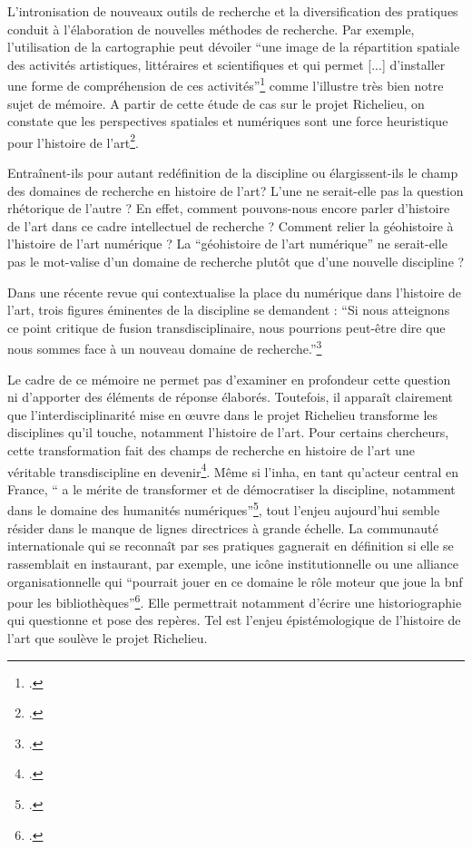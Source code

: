 L'intronisation de nouveaux outils de recherche et la diversification des pratiques conduit à l'élaboration de nouvelles méthodes de recherche. Par exemple, l'utilisation de la cartographie peut dévoiler \enquote{une image de la répartition spatiale des activités artistiques, littéraires et scientifiques et qui permet [...] d’installer une forme de compréhension de ces activités}\footcite{BESSEApproches2010} comme l'illustre très bien notre sujet de mémoire. A partir de cette étude de cas sur le projet Richelieu, on constate que les perspectives spatiales et numériques sont une force heuristique pour l'histoire de l'art\footcite{WINDHAGERReview}. 

Entraînent-ils pour autant redéfinition de la discipline ou élargissent-ils le champ des domaines de recherche en histoire de l'art? L'une ne serait-elle pas la question rhétorique de l'autre ? En effet, comment pouvons-nous encore parler d'histoire de l'art dans ce cadre intellectuel de recherche ? Comment relier la géohistoire à l'histoire de l'art numérique ? La \enquote{géohistoire de l'art numérique} ne serait-elle pas le mot-valise d'un domaine de recherche plutôt que d'une nouvelle discipline ?

Dans une récente revue qui contextualise la place du numérique dans l'histoire de l'art, trois figures éminentes de la discipline se demandent : \enquote{Si nous atteignons ce point critique de fusion transdisciplinaire, nous pourrions peut-être dire que nous sommes face à un nouveau domaine de recherche.}\footcite{JOYEUX-PRUNELComment2021}

Le cadre de ce mémoire ne permet pas d'examiner en profondeur cette question ni d'apporter des éléments de réponse élaborés. Toutefois, il apparaît clairement que l'interdisciplinarité mise en œuvre dans le projet Richelieu transforme les disciplines qu'il touche, notamment l'histoire de l'art. Pour certains chercheurs, cette transformation fait des champs de recherche en histoire de l'art une véritable transdiscipline en devenir\footcite{BONFAITHumanites2021a}. Même si l'\acrshort{inha}, en tant qu'acteur central en France, \enquote{ a le mérite de transformer et de démocratiser la discipline, notamment dans le domaine des humanités numériques}\footcite{HCERESRapport2024}, tout l'enjeu aujourd'hui semble résider dans le manque de lignes directrices à grande échelle. La communauté internationale qui se reconnaît par ses pratiques gagnerait en définition si elle se rassemblait en instaurant, par exemple, une icône institutionnelle ou une alliance organisationnelle qui \enquote{pourrait jouer en ce domaine le rôle moteur que joue la \acrshort{bnf} pour les bibliothèques}\footcite{DELMAS-GLASSHumanites2021}. Elle permettrait notamment d'écrire une historiographie qui questionne et pose des repères. Tel est l'enjeu épistémologique de l'histoire de l'art que soulève le projet Richelieu. 

